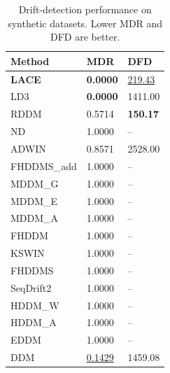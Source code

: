\begin{table}
\caption{Drift-detection performance on synthetic datasets. Lower MDR and DFD are better.}
\label{tab:baseline_drift_detection}
\begin{tabular}{lll}
\toprule
Method & MDR & DFD \\
\midrule
\textbf{LACE} & \textbf{0.0000} & \underline{219.43} \\
LD3 & \textbf{0.0000} & 1411.00 \\
RDDM & 0.5714 & \textbf{150.17} \\
ND & 1.0000 & -- \\
ADWIN & 0.8571 & 2528.00 \\
FHDDMS\_add & 1.0000 & -- \\
MDDM\_G & 1.0000 & -- \\
MDDM\_E & 1.0000 & -- \\
MDDM\_A & 1.0000 & -- \\
FHDDM & 1.0000 & -- \\
KSWIN & 1.0000 & -- \\
FHDDMS & 1.0000 & -- \\
SeqDrift2 & 1.0000 & -- \\
HDDM\_W & 1.0000 & -- \\
HDDM\_A & 1.0000 & -- \\
EDDM & 1.0000 & -- \\
DDM & \underline{0.1429} & 1459.08 \\
\bottomrule
\end{tabular}
\end{table}
